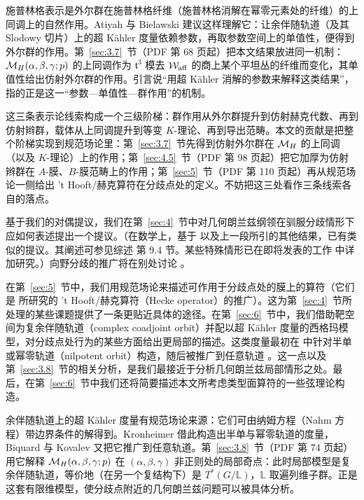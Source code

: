 \begin{yizhu}[含糊点拨]
施普林格表示是外尔群在施普林格纤维（施普林格消解在幂零元素处的纤维）的上同调上的自然作用。Atiyah 与 Bielawski \cite{ref31} 建议这样理解它：让余伴随轨道（及其 Slodowy 切片）上的超 Kähler 度量依赖参数，再取参数空间上的单值性，便得到外尔群的作用。第~\ref{sec:3.7}~节（PDF 第 68 页起）把本文结果放进同一机制：${{\mathcal{M}}_H}(\alpha,\beta,\gamma;p)$ 的上同调作为 $\mathfrak t^3$ 模去 ${\mathcal W}_{\rm aff}$ 的商上某个平坦丛的纤维而变化，其单值性给出仿射外尔群的作用。引言说“用超 Kähler 消解的参数来解释这类结果”，指的正是这一“参数—单值性—群作用”的机制。
\end{yizhu}

\begin{yizhu}[物理图像补充]
这三条表示论线索构成一个三级阶梯：群作用从外尔群提升到仿射赫克代数、再到仿射辫群，载体从上同调提升到等变 $K$-理论、再到导出范畴。本文的贡献是把整个阶梯实现到规范场论里：第~\ref{sec:3.7}~节先得到仿射外尔群在 ${{\mathcal{M}}_H}$ 的上同调（以及 $K$-理论）上的作用；第~\ref{sec:4.5}~节（PDF 第 98 页起）把它加厚为仿射辫群在 $A$-膜、$B$-膜范畴上的作用；第~\ref{sec:5}~节（PDF 第 110 页起）再从规范场论一侧给出 't Hooft/赫克算符在分歧点处的定义。不妨把这三处看作三条线索各自的落点。
\end{yizhu}

基于我们的对偶提议，我们在第~\ref{sec:4}~节中对几何朗兰兹纲领在驯服分歧情形下应如何表述提出一个提议。（在数学上，基于 \cite{ref29} 以及上一段所引的其他结果，已有类似的提议。其阐述可参见综述 \cite{ref7} 第 9.4 节。某些特殊情形已在即将发表的工作 \cite{ref32} 中详加研究。）向野分歧的推广将在别处讨论 \cite{ref33}。

在第~\ref{sec:5}~节中，我们用规范场论来描述可作用于分歧点处的膜上的算符（它们是 \cite{ref8} 所研究的 't Hooft/赫克算符（Hecke operator）的推广）。这为第~\ref{sec:4}~节所处理的某些课题提供了一条更贴近具体的途径。在第~\ref{sec:6}~节中，我们借助靶空间为复余伴随轨道（complex coadjoint orbit）并配以超 Kähler 度量的西格玛模型，对分歧点处行为的某些方面给出更局部的描述。这类度量最初在 \cite{ref34,ref35} 中针对半单或幂零轨道（nilpotent orbit）构造，随后被推广到任意轨道 \cite{ref36,ref37}。这一点以及第~\ref{sec:3.8}~节的相关分析，是我们最接近于分析几何朗兰兹局部情形之处。最后，在第~\ref{sec:6}~节中我们还将简要描述本文所考虑类型面算符的一些弦理论构造。

\begin{yizhu}[物理图像补充]
余伴随轨道上的超 Kähler 度量有规范场论来源：它们可由纳姆方程（Nahm 方程）带边界条件的解得到。Kronheimer \cite{ref34,ref35} 借此构造出半单与幂零轨道的度量，Biquard 与 Kovalev \cite{ref36,ref37} 又把它推广到任意轨道。第~\ref{sec:3.8}~节（PDF 第 74 页起）用它解释 ${{\mathcal{M}}_H}(\alpha,\beta,\gamma;p)$ 在 $(\alpha,\beta,\gamma)$ 非正则处的局部奇点：此时局部模型是复余伴随轨道，等价地（在另一个复结构下）是 $T^*(G/\mathbb{L})$，$\mathbb{L}$ 取遍列维子群。正是这套有限维模型，使分歧点附近的几何朗兰兹问题可以被具体分析。
\end{yizhu}

